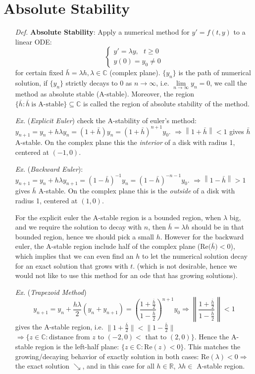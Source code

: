 \documentclass[a4paper, 11pt]{article}
\begin{document}
\section{Absolute Stability}
\begin{itemize}
	\item[\textit{Def.}] \textbf{Absolute Stability}: Apply a numerical method for $y'=f(t,y)$ to a linear ODE:
	\begin{equation}
		\begin{cases}
		y' = \lambda y, ~~~t\geq 0\\
		y(0) = y_0 \ne 0
		\end{cases}
	\end{equation}
	for certain fixed $\bar{h} = \lambda h, \lambda \in \mathbb{C}$ (complex plane). $\{y_n\}$ is the path of numerical solution, if $\{y_n\}$ strictly decays to $0$ as $n\to \infty$, i.e. $\lim\limits_{n\rightarrow\infty} y_n =0$, we call the method as absolute stable (A-stable). Moreover, the region $\{\bar{h}: \bar{h}~\text{is A-stable}\} \subseteq \mathbb{C}$ is called the region of absolute stability of the method.

	\item[\textit{Ex.}] (\emph{Explicit Euler}) check the A-stability of euler's method: $y_{n+1} = y_n + h \lambda y_n = (1+\bar{h})y_n = (1+ \bar{h})^{n+1} y_0$. $\Rightarrow \left\|1+\bar{h}\right\|<1$ gives $\bar{h}$ A-stable. On the complex plane this the \emph{interior} of a disk with radius 1, centered at $(-1, 0)$.

	\item[\textit{Ex.}] (\emph{Backward Euler}): $y_{n+1} = y_n + h \lambda y_{n+1} = (1-\bar{h})^{-1}y_n = (1- \bar{h})^{-n-1} y_0$. $\Rightarrow \left\|1-\bar{h}\right\|>1$ gives $\bar{h}$ A-stable. On the complex plane this is the \emph{outside} of a disk with radius 1, centered at $(1, 0)$.

	For the explicit euler the A-stable region is a bounded region, when $\lambda$ big, and we require the solution to decay with $n$, then $\bar{h}= \lambda h$ should be in that bounded region, hence we should pick a small $h$. However for the backward euler, the A-stable region include half of the complex plane ($\text{Re($\bar{h}$)}<0$), which implies that we can even find an $h$ to let the numerical solution decay for an exact solution that grows with $t$. (which is not desirable, hence we would not like to use this method for an ode that has growing solutions).

	\item[\textit{Ex.}] (\emph{Trapezoid Method})
	$$
	y_{n+1} = y_n + \frac{h \lambda}{2}(y_n + y_{n+1}) = \left(\frac{1+ \frac{\bar{h}}{2}}{1-\frac{\bar{h}}{2}}\right)^{n+1} y_0 \Rightarrow \left\|\frac{1+ \frac{\bar{h}}{2}}{1-\frac{\bar{h}}{2}}\right\| < 1
	$$
	gives the A-stable region, i.e. $\|1+\tfrac{\bar{h}}{2}\|< \|1-\tfrac{\bar{h}}{2}\|$ $\Rightarrow \{z \in \mathbb{C}: \text{distance from $z$ to $(-2,0)<$ that to $(2, 0)$}\}$.
	Hence the A-stable region is the left-half plane: $\{z\in \mathbb{C}: \text{Re}(z) < 0\}$. This matches the growing/decaying behavior of exactly solution in both cases: Re$(\lambda)<0 \Rightarrow$ the exact solution $\searrow$, and in this case for all $h\in \mathbb{R}$, $\lambda h \in$ A-stable region. 


\end{itemize}
\end{document}
